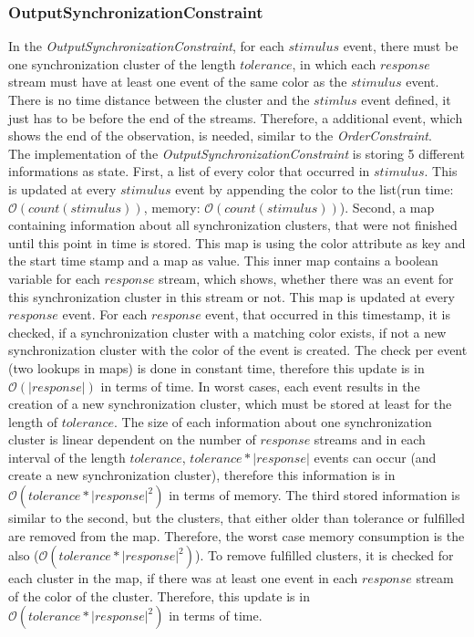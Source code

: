 \subsubsection{OutputSynchronizationConstraint}
	In the \emph{OutputSynchronizationConstraint}, for each $stimulus$ event, there must be one synchronization cluster of the length $tolerance$, in which each $response$ stream must have at least one event of the same color as the $stimulus$ event. There is no time distance between the cluster and the $stimlus$ event defined, it just has to be before the end of the streams. Therefore, a additional event, which shows the end of the observation, is needed, similar to the \emph{OrderConstraint}.\\
	The implementation of the \emph{OutputSynchronizationConstraint} is storing 5 different informations as state. First, a list of every color that occurred in $stimulus$. This is updated at every $stimulus$ event by appending the color to the list(run time: $\mathcal{O}(count(stimulus))$, memory: $\mathcal{O}(count(stimulus))$). 
	Second, a map containing information about all synchronization clusters, that were not finished until this point in time is stored. This map is using the color attribute as key and the start time stamp and a map as value. This inner map contains a boolean variable for each $response$ stream, which shows, whether there was an event for this synchronization cluster in this stream or not. This map is updated at every $response$ event. For each $response$ event, that occurred in this timestamp, it is checked, if a synchronization cluster with a matching color exists, if not a new synchronization cluster with the color of the event is created. The check per event (two lookups in maps)  is done in constant time, therefore this update is in $\mathcal{O}(|response|)$ in terms of time. In worst cases, each event results in the creation of a new synchronization cluster, which must be stored at least for the length of $tolerance$. The size of each information about one synchronization cluster is linear dependent on the number of $response$ streams and in each interval of the length $tolerance$, $tolerance*|response|$ events can occur (and create a new synchronization cluster), therefore this information is in $\mathcal{O}(tolerance*|response|^2)$ in terms of memory. The third stored information is similar to the second, but the clusters, that either older than tolerance or fulfilled are removed from the map. Therefore, the worst case memory consumption is the also ($\mathcal{O}(tolerance*|response|^2)$). To remove fulfilled clusters, it is checked for each cluster in the map, if there was at least one event in each $response$ stream of the color of the cluster. Therefore, this update is in $\mathcal{O}(tolerance*|response|^2)$ in terms of time.
